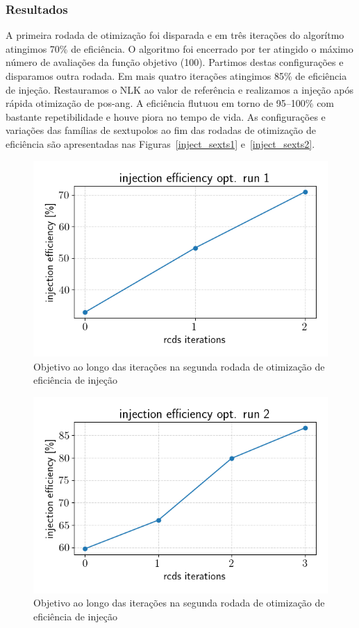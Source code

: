 \documentclass[a4paper,
               keeplastbox,   %
               ]{jacow}
\begin{document}
\subsubsection{Resultados}
A primeira rodada de otimização foi disparada e em três iterações do algorítmo atingimos 70\% de eficiência. O algoritmo foi encerrado por ter atingido o máximo número de avaliações da função objetivo (100). Partimos destas configurações e disparamos outra rodada. Em mais quatro iterações atingimos 85\% de eficiência de injeção. Restauramos o NLK ao valor de referência e realizamos a injeção após rápida otimização de pos-ang. A eficiência flutuou em torno de 95--100\% com bastante repetibilidade e houve piora no tempo de vida. 
As configurações e variações das famílias de sextupolos ao fim das rodadas de otimização de eficiência são apresentadas nas Figuras~\ref{inject_sexts1} e~\ref{inject_sexts2}.
\begin{figure}
    \centering
    \includegraphics[width=\columnwidth]{injeff_hist_run1.png}
    \caption{Objetivo ao longo das iterações na segunda rodada de otimização de eficiência de injeção}
    \label{injeff_hist1}
\end{figure}

\begin{figure}
    \centering
    \includegraphics[width=\columnwidth]{injeff_hist_run2.png}
    \caption{Objetivo ao longo das iterações na segunda rodada de otimização de eficiência de injeção}
    \label{injeff_hist2}
\end{figure}
\end{document}
